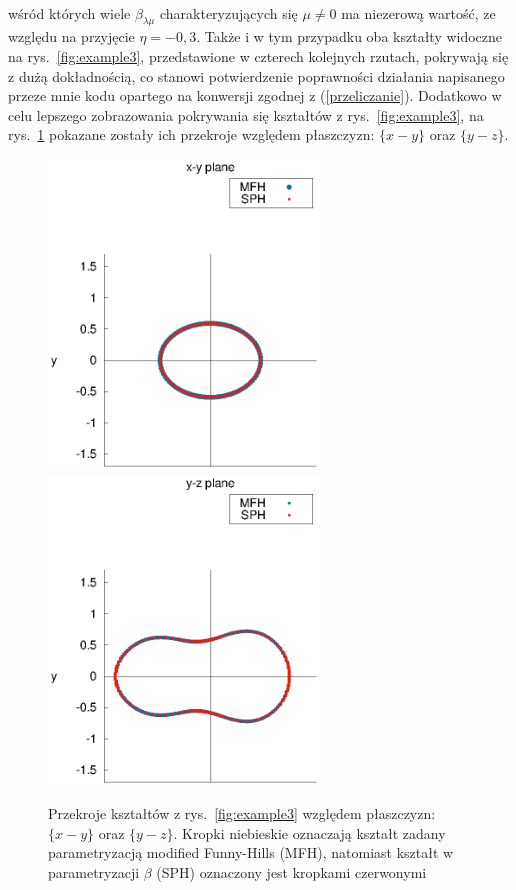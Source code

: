 \documentclass[a4paper,polish]{article}
\numberwithin{equation}{section}
\begin{document}
\\
wśród których wiele $\beta_{\lambda \mu}$ charakteryzujących się $\mu \neq 0$ ma niezerową wartość, ze względu na przyjęcie $\eta=-0,3$. Także i w tym przypadku oba kształty widoczne na rys.~\ref{fig:example3}, przedstawione w czterech kolejnych rzutach, pokrywają się z dużą dokładnością, co stanowi potwierdzenie poprawności działania napisanego przeze mnie kodu opartego na konwersji zgodnej z (\ref{przeliczanie}). Dodatkowo w celu lepszego zobrazowania pokrywania się kształtów z rys.~\ref{fig:example3}, na rys.~\ref{przekroje} pokazane zostały ich przekroje względem płaszczyzn: $\{x-y\}$ oraz $\{y-z\}$.
\bigskip
\bigskip
\begin{figure}[ht!]
	\centering
	\includegraphics[width=7.2cm]{xy_plane.eps}    
	\includegraphics[width=7.2cm]{yz_plane.eps}\\    
	\caption{Przekroje kształtów z rys.~\ref{fig:example3} względem płaszczyzn: $\{x-y\}$ oraz $\{y-z\}$. Kropki niebieskie oznaczają kształt zadany parametryzacją modified Funny-Hills (MFH), natomiast kształt w parametryzacji $\beta$ (SPH) oznaczony jest kropkami czerwonymi}
	\label{przekroje}%
\end{figure}
\end{document}

